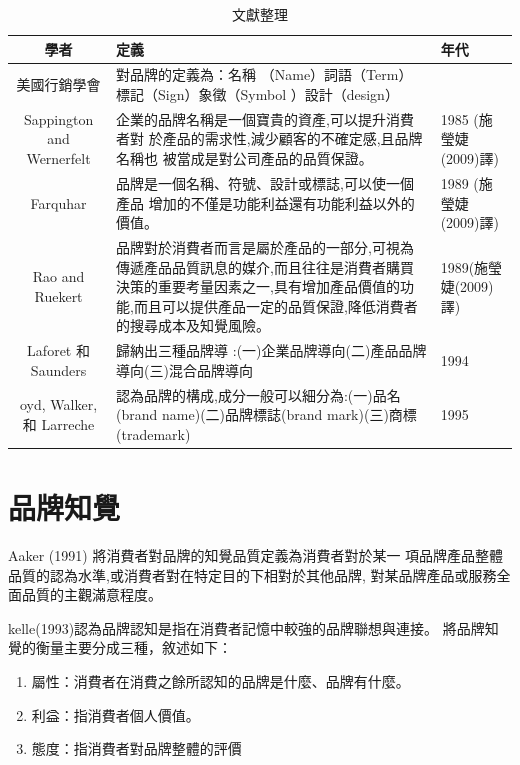 \begin{table}[htb]
\caption{文獻整理}
\label{tab:PL1}
\centering
%
\begin{tabular}[t]{|c|p{8.5cm}|p{2.5cm}|} %
\hline
學者&定義 & 年代 \tabularnewline
\hline
美國行銷學會 & 對品牌的定義為：名稱 （Name）詞語（Term） 標記（Sign）象徵（Symbol ）設計（design）&  \tabularnewline
\hline
Sappington and Wernerfelt  &企業的品牌名稱是一個寶貴的資產,可以提升消費者對
於產品的需求性,減少顧客的不確定感,且品牌名稱也
被當成是對公司產品的品質保證。& 1985 (施瑩婕(2009)譯) \tabularnewline
\hline
Farquhar &品牌是一個名稱、符號、設計或標誌,可以使一個產品
增加的不僅是功能利益還有功能利益以外的價值。&1989 (施瑩婕(2009)譯) \tabularnewline
\hline
Rao and Ruekert &品牌對於消費者而言是屬於產品的一部分,可視為傳遞產品品質訊息的媒介,而且往往是消費者購買決策的重要考量因素之一,具有增加產品價值的功能,而且可以提供產品一定的品質保證,降低消費者的搜尋成本及知覺風險。&1989(施瑩婕(2009)譯)  \tabularnewline
\hline
 Laforet 和 Saunders&歸納出三種品牌導 :(一)企業品牌導向(二)產品品牌導向(三)混合品牌導向
&1994\tabularnewline
\hline
oyd, Walker, 和 Larreche&認為品牌的構成,成分一般可以細分為:(一)品名(brand name)(二)品牌標誌(brand mark)(三)商標(trademark)&1995\tabularnewline
\hline
\end{tabular}
\end{table}

\section{品牌知覺}
Aaker (1991) 將消費者對品牌的知覺品質定義為消費者對於某一 項品牌產品整體品質的認為水準,或消費者對在特定目的下相對於其他品牌, 對某品牌產品或服務全面品質的主觀滿意程度。\cite{Aaker1991}

kelle(1993)認為品牌認知是指在消費者記憶中較強的品牌聯想與連接。\cite{Keller1993}
將品牌知覺的衡量主要分成三種，敘述如下：
\begin{enumerate}
\item 屬性：消費者在消費之餘所認知的品牌是什麼、品牌有什麼。
\item 利益：指消費者個人價值。
\item 態度：指消費者對品牌整體的評價
\end{enumerate}


